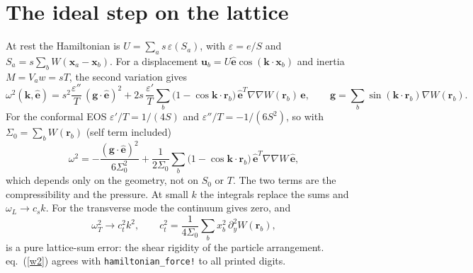 \documentclass[11pt,aps,preprint,nofootinbib,superscriptaddress,tightenlines]{revtex4-2}
\def\st{\begin{equation}}
\def\stp{\end{equation}}
\def\Eq#1{eq.~(\ref{#1})}
\begin{document}
\section{The ideal step on the lattice}

At rest the Hamiltonian is $U=\sum_as\,\varepsilon(S_a)$, with $\varepsilon=e/S$ and
$S_a=s\sum_bW(\bm x_a-\bm x_b)$.  For a displacement
$\bm u_b=U\hat{\bm e}\cos(\bm k\cdot\bm x_b)$ and inertia $M=V_aw=sT$, the second
variation gives
\st
\omega^2(\bm k,\hat{\bm e})=s^2\frac{\varepsilon''}{T}\,(\bm g\cdot\hat{\bm e})^2
+2s\,\frac{\varepsilon'}{T}\sum_b\big(1-\cos\bm k\cdot\bm r_b\big)\,
\hat{\bm e}^T\nabla\nabla W(\bm r_b)\,\hat{\bm e},
\qquad \bm g=\sum_b\sin(\bm k\cdot\bm r_b)\nabla W(\bm r_b).
\stp
For the conformal EOS $\varepsilon'/T=1/(4S)$ and $\varepsilon''/T=-1/(6S^2)$, so with
$\Sigma_0=\sum_bW(\bm r_b)$ (self term included)
\st
\omega^2=-\frac{(\bm g\cdot\hat{\bm e})^2}{6\Sigma_0^2}
+\frac1{2\Sigma_0}\sum_b\big(1-\cos\bm k\cdot\bm r_b\big)\,\hat{\bm e}^T\nabla\nabla W\,\hat{\bm e},
\label{w2}
\stp
which depends only on the geometry, not on $S_0$ or $T$.  The two terms are the
compressibility and the pressure.  At small $k$ the integrals replace the sums
and $\omega_L\to c_sk$.  For the transverse mode the continuum gives zero, and
\st
\omega_T^2\to c_t^2k^2,\qquad c_t^2=\frac1{4\Sigma_0}\sum_bx_b^2\,\partial_y^2W(\bm r_b),
\stp
is a pure lattice-sum error: the shear rigidity of the particle arrangement.
\Eq{w2} agrees with \texttt{hamiltonian\_force!} to all printed digits.
\end{document}
